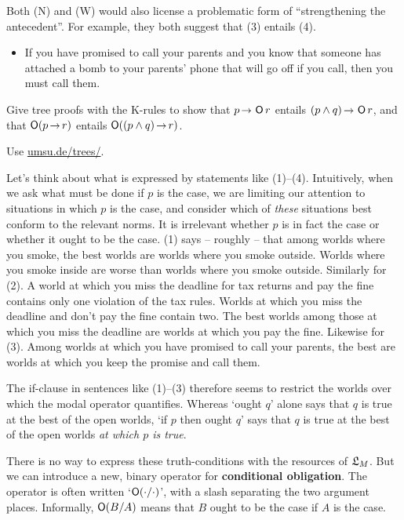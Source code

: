 Both (N) and (W) would also license a problematic form of ``strengthening the
antecedent''. For example, they both suggest that (3) entails (4).
\begin{itemize}[leftmargin=10mm]
\itemsep-1mm
\item[(4)] If you have promised to call your parents and you know that someone
  has attached a bomb to your parents' phone that will go off if you call, then
  you must call them.
\end{itemize}

\begin{exercise}
  Give tree proofs with the K-rules to show that $p \to \Ob r$ entails
  $(p \land q) \to \Ob r$, and that $\Ob (p \to r)$ entails
  $\Ob((p \land q) \to r)$.
\end{exercise}
\begin{solution}
  Use \href{https://www.umsu.de/trees/}{umsu.de/trees/}.
\end{solution}

Let's think about what is expressed by statements like (1)--(4). Intuitively,
when we ask what must be done if $p$ is the case, we are limiting our attention
to situations in which $p$ is the case, and consider which of \emph{these}
situations best conform to the relevant norms. It is irrelevant whether $p$ is
in fact the case or whether it ought to be the case. (1) says -- roughly -- that
among worlds where you smoke, the best worlds are worlds where you smoke
outside. Worlds where you smoke inside are worse than worlds where you smoke
outside. Similarly for (2). A world at which you miss the deadline for tax
returns and pay the fine contains only one violation of the tax rules. Worlds at
which you miss the deadline and don't pay the fine contain two. The best
worlds among those at which you miss the deadline are worlds at which you pay
the fine. Likewise for (3). Among worlds at which you have promised to call your
parents, the best are worlds at which you keep the promise and call them.

The if-clause in sentences like (1)--(3) therefore seems to restrict the worlds
over which the modal operator quantifies. Whereas `ought $q$' alone says that
$q$ is true at the best of the open worlds, `if $p$ then ought $q$' says that
$q$ is true at the best of the open worlds \emph{at which $p$ is true}.

There is no way to express these truth-conditions with the resources of $\mathfrak{L}_M$.
But we can introduce a new, binary operator for \textbf{conditional obligation}.
The operator is often written `$\operatorname{\mathsf{O}}(\cdot/\cdot)$', with a slash separating the
two argument places. Informally, $\operatorname{\mathsf{O}}(B/A)$ means that $B$ ought to be the
case if $A$ is the case.

